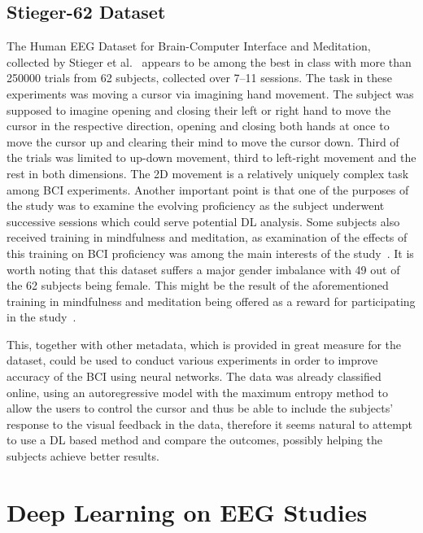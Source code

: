 \documentclass[english, he, bc, kiv, iso690alph]{fasthesis}
\begin{document}

\subsection{Stieger-62 Dataset}

The Human EEG Dataset for Brain-Computer Interface and Meditation, collected by Stieger et al.~\cite{data:stieger:21} appears to be among the best in class with more than 250000 trials from 62 subjects, collected over 7--11 sessions.
The task in these experiments was moving a cursor via imagining hand movement. The subject was supposed to imagine opening and closing their left or right hand to move the cursor in the respective direction, opening and closing both hands at once to move the cursor up and clearing their mind to move the cursor down. Third of the trials was limited to up-down movement, third to left-right movement and the rest in both dimensions.
The 2D movement is a relatively uniquely complex task among BCI experiments.
Another important point is that one of the purposes of the study was to examine the evolving proficiency as the subject underwent successive sessions which could serve potential DL analysis.
Some subjects also received training in mindfulness and meditation, as examination of the effects of this training on BCI proficiency was among the main interests of the study~\cite{stieger:mindfulness:20}. It is worth noting that this dataset suffers a major gender imbalance with 49 out of the 62 subjects being female. This might be the result of the aforementioned training in mindfulness and meditation being offered as a reward for participating in the study~\cite{data:stieger:21}.

This, together with other metadata, which is provided in great measure for the dataset, could be used to conduct various experiments in order to improve accuracy of the BCI using neural networks.
The data was already classified online, using an autoregressive model with the maximum entropy method to allow the users to control the cursor and thus be able to include the subjects' response to the visual feedback in the data, therefore it seems natural to attempt to use a DL based method and compare the outcomes, possibly helping the subjects achieve better results.

\section{Deep Learning on EEG Studies}
\end{document}
